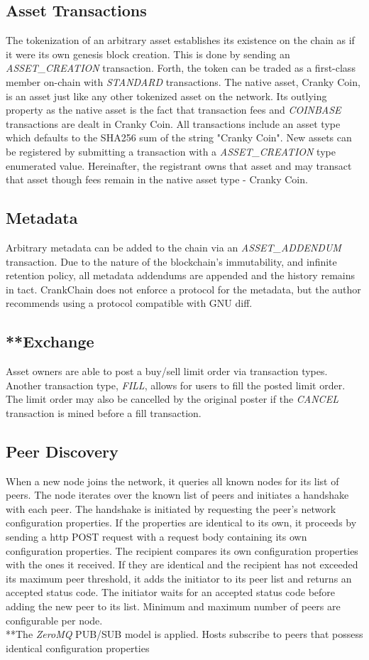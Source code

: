 \documentclass[10pt,twocolumn]{article}
\begin{document}
\subsection{Asset Transactions}
The tokenization of an arbitrary asset establishes its existence on the chain as if it were its own genesis block creation.  This is done by sending an \textit{ASSET\_CREATION} transaction. Forth, the token can be traded as a first-class member on-chain with \textit{STANDARD} transactions.  The native asset, Cranky Coin, is an asset just like any other tokenized asset on the network.  Its outlying property as the native asset is the fact that transaction fees and \textit{COINBASE} transactions are dealt in Cranky Coin.
All transactions include an asset type which defaults to the SHA256 sum of the string "Cranky Coin".  New assets can be registered by submitting a transaction with a \textit{ASSET\_CREATION} type enumerated value.  Hereinafter, the registrant owns that asset and may transact that asset though fees remain in the native asset type - Cranky Coin.
\subsection{Metadata}
Arbitrary metadata can be added to the chain via an \textit{ASSET\_ADDENDUM}  transaction.
Due to the nature of the blockchain's immutability, and infinite retention policy, all metadata addendums are appended and the history remains in tact.  CrankChain does not enforce a protocol for the metadata, but the author recommends using a protocol compatible with GNU diff\cite{man:diff}.
\subsection{**Exchange}
Asset owners are able to post a buy/sell limit order via  transaction types.  Another transaction type, \textit{FILL}, allows for users to fill the posted limit order.  The limit order may also be cancelled by the original poster if the \textit{CANCEL} transaction is mined before a fill transaction.
\subsection{Peer Discovery}
When a new node joins the network, it queries all known nodes for its list of peers.  The node iterates over the known list of peers and initiates a handshake with each peer.  The handshake is initiated by requesting the peer's network configuration properties.  If the properties are identical to its own, it proceeds by sending a http POST request with a request body containing its own configuration properties.  The recipient compares its own configuration properties with the ones it received.  If they are identical and the recipient has not exceeded its maximum peer threshold, it adds the initiator to its peer list and returns an accepted status code.  The initiator waits for an accepted status code before adding the new peer to its list.  Minimum and maximum number of peers are configurable per node.\\
**The \textit{ZeroMQ} PUB/SUB model is applied.  Hosts subscribe to peers that possess identical configuration properties
\end{document}
